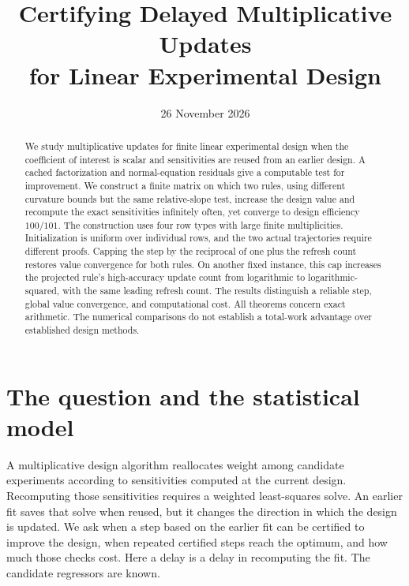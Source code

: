 \documentclass[11pt]{article}
\title{Certifying Delayed Multiplicative Updates\\for Linear Experimental Design}
\author{}
\date{26 November 2026}
\begin{document}
\maketitle\internalnotice
\begin{abstract}
We study multiplicative updates for finite linear experimental design when the coefficient of interest is scalar and sensitivities are reused from an earlier design. A cached factorization and normal-equation residuals give a computable test for improvement. We construct a finite matrix on which two rules, using different curvature bounds but the same relative-slope test, increase the design value and recompute the exact sensitivities infinitely often, yet converge to design efficiency $100/101$. The construction uses four row types with large finite multiplicities. Initialization is uniform over individual rows, and the two actual trajectories require different proofs. Capping the step by the reciprocal of one plus the refresh count restores value convergence for both rules. On another fixed instance, this cap increases the projected rule's high-accuracy update count from logarithmic to logarithmic-squared, with the same leading refresh count. The results distinguish a reliable step, global value convergence, and computational cost. All theorems concern exact arithmetic. The numerical comparisons do not establish a total-work advantage over established design methods.
\end{abstract}

\section{The question and the statistical model}
A multiplicative design algorithm reallocates weight among candidate experiments according to sensitivities computed at the current design.
Recomputing those sensitivities requires a weighted least-squares solve. An earlier fit saves that solve when reused, but it changes the direction in which the design is updated.
We ask when a step based on the earlier fit can be certified to improve the design, when repeated certified steps reach the optimum, and how much those checks cost.
Here a delay is a delay in recomputing the fit. The candidate regressors are known.
\end{document}
